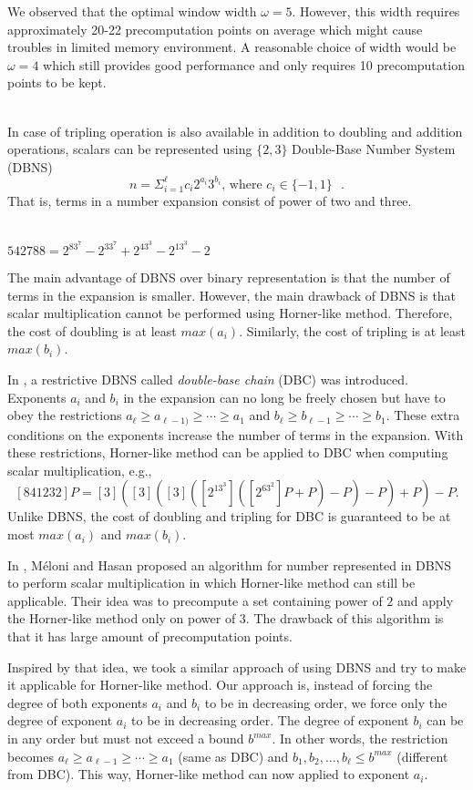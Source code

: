 We observed that the optimal window width $\omega = 5$.
However, this width requires approximately 20-22 precomputation points on average
which might cause troubles in limited memory environment.
A reasonable choice of width would be $\omega = 4$ which still provides good performance
and only requires 10 precomputation points to be kept.



 \\
\label{sec:dbns}
In case of tripling operation is also available in addition to doubling and addition operations,
scalars can be represented using $\{2,3\}$ Double-Base Number System (DBNS)
$$n = \Sigma^{\ell}_{i=1} c_i 2^{a_i}3^{b_i} \text{, where $c_i \in \{-1,1\}$ }.$$
That is, terms in a number expansion consist of power of two and three.

 \\
$542788 = 2^83^7 - 2^33^7 + 2^43^3 - 2^13^3 - 2$

The main advantage of DBNS over binary representation is that the number of terms in the expansion is smaller.
However, the main drawback of DBNS is that scalar multiplication cannot be performed using Horner-like method.
Therefore, the cost of doubling is at least $max(a_i)$.  Similarly, the cost of tripling is at least $max(b_i)$.

In \cite{DIM05}, a restrictive DBNS called {\it{double-base chain}} (DBC) was introduced.
Exponents $a_i$ and $b_i$ in the expansion can no long be freely chosen but have to obey the restrictions
$a_\ell \ge a_{\ell-1)} \ge \cdots \ge a_1$ and $b_\ell \ge b_{\ell-1} \ge \cdots \ge b_1$.
These extra conditions on the exponents increase the number of terms in the expansion.
With these restrictions, Horner-like method can be applied to DBC when computing scalar multiplication, e.g.,
$$[841232]P = [3]([3]([3]([2^13^3]([2^63^2]P+P)-P)-P)+P)-P.$$
Unlike DBNS, the cost of doubling and tripling for DBC is guaranteed to be at most $max(a_i)$ and $max(b_i)$.

In \cite{MH09}, M\'eloni and Hasan proposed an algorithm for number represented in DBNS to perform scalar multiplication
in which Horner-like method can still be applicable.
Their idea was to precompute a set containing power of $2$ and apply the Horner-like method only on power of $3$.
The drawback of this algorithm is that it has large amount of precomputation points.

Inspired by that idea, we took a similar approach of using DBNS and try to make it applicable for Horner-like method.
Our approach is, instead of forcing the degree of both exponents $a_i$ and $b_i$ to be in decreasing order,
we force only the degree of exponent $a_i$ to be in decreasing order.
The degree of exponent $b_i$ can be in any order but must not exceed a bound $b^{max}$.
In other words, the restriction becomes
$a_\ell \ge a_{\ell-1} \ge \cdots \ge a_1$ (same as DBC) and $b_1,b_2,\dots,b_\ell \le b^{max}$ (different from DBC).
This way, Horner-like method can now applied to exponent $a_i$.

